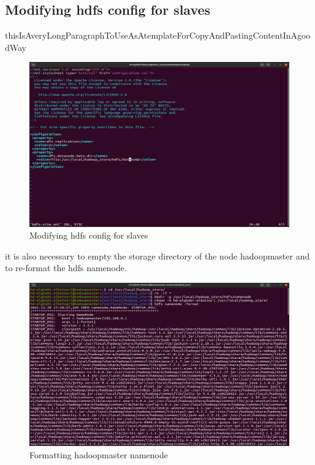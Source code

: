\begin{spacing}{1.2}
\section{Modifying hdfs config for slaves}

\par thisIsAveryLongParagraphToUseAsAtemplateForCopyAndPastingContentInAgoodWay
\\
\begin{figure}[!htb] 
\begin{center} 
\includegraphics[width=1\linewidth]{Big_Data/Hadoop/Multi-Nodes Cluster/Modifying hdfs config for slaves} 
\end{center} 
\caption{Modifying hdfs config for slaves} 
\end{figure} 
\FloatBarrier

\par it is also necessary to empty the storage directory of the node hadoopmaster and to re-format the hdfs namenode.
\\
\begin{figure}[!htb] 
\begin{center} 
\includegraphics[width=1\linewidth]{Big_Data/Hadoop/Multi-Nodes Cluster/Formatting hadoopmaster namenode} 
\end{center} 
\caption{Formatting hadoopmaster namenode} 
\end{figure} 
\FloatBarrier



\end{spacing}
